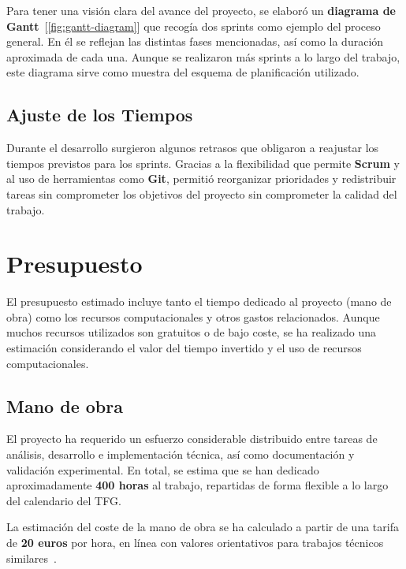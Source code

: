 Para tener una visión clara del avance del proyecto, se elaboró un \textbf{diagrama de Gantt}~[\ref{fig:gantt-diagram}]
que recogía dos sprints como ejemplo del proceso general.
En él se reflejan las distintas fases mencionadas, así como la duración aproximada de cada una.
Aunque se realizaron más sprints a lo largo del trabajo, este diagrama sirve como muestra del esquema de planificación
utilizado.

\subsection{Ajuste de los Tiempos}\label{subsec:ajuste-de-los-tiempos}
Durante el desarrollo surgieron algunos retrasos que obligaron a reajustar los tiempos previstos para los sprints.
Gracias a la flexibilidad que permite \textbf{Scrum} y al uso de herramientas como \textbf{Git},
permitió reorganizar prioridades y redistribuir tareas sin comprometer los objetivos del proyecto sin comprometer la calidad del trabajo.

\section{Presupuesto}\label{sec:presupuesto}
El presupuesto estimado incluye tanto el tiempo dedicado al proyecto (mano de obra) como los recursos computacionales y
otros gastos relacionados.
Aunque muchos recursos utilizados son gratuitos o de bajo coste, se ha realizado una estimación considerando el valor
del tiempo invertido y el uso de recursos computacionales.

\subsection{Mano de obra}\label{subsec:mano-de-obra}
El proyecto ha requerido un esfuerzo considerable distribuido entre tareas de análisis, desarrollo e implementación técnica,
así como documentación y validación experimental.
En total, se estima que se han dedicado aproximadamente \textbf{400 horas} al trabajo, repartidas de forma flexible a lo largo del calendario del TFG.

La estimación del coste de la mano de obra se ha calculado a partir de una tarifa de \textbf{20 euros} por hora,
en línea con valores orientativos para trabajos técnicos similares~\cite{SalarioParaData}.

